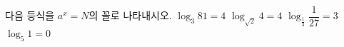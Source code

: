 다음 등식을 $a^x=N$의 꼴로 나타내시오.
 $\log_3 81=4$
 $\log_{\sqrt{2}} 4=4$
 $\log_{\frac{1}{3}} \dfrac{1}{27}=3$
 $\log_5 1=0$
